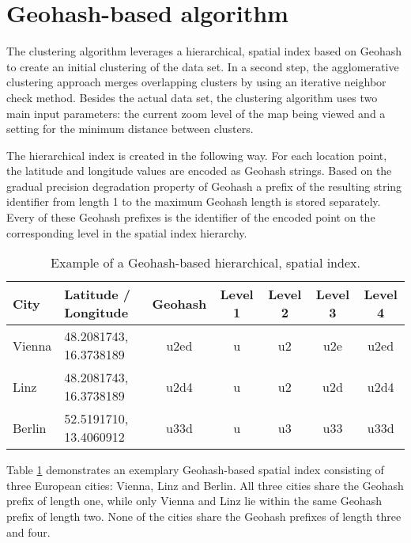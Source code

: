 
%
%

\section{Geohash-based algorithm}
\label{chapter:algorithm}

The clustering algorithm leverages a hierarchical, spatial index based on Geohash to create an initial clustering of the data set. In a second step, the agglomerative clustering approach merges overlapping clusters by using an iterative neighbor check method. Besides the actual data set, the clustering algorithm uses two main input parameters: the current zoom level of the map being viewed and a setting for the minimum distance between clusters. 

The hierarchical index is created in the following way. For each location point, the latitude and longitude values are encoded as Geohash strings. Based on the gradual precision degradation property of Geohash a prefix of the resulting string identifier from length 1 to the maximum Geohash length is stored separately. Every of these Geohash prefixes is the identifier of the encoded point on the corresponding level in the spatial index hierarchy. 


\begin{table}[ht]
\begin{center}
\begin{tabular}{ |l|l|c|c|c|c|c| }
  \hline
  City & Latitude / Longitude & Geohash & Level 1 & Level 2 & Level 3 & Level 4  \\
  \hline
  Vienna & 48.2081743, 16.3738189 & u2ed & u & u2 & u2e & u2ed \\
  Linz   & 48.2081743, 16.3738189 & u2d4 & u & u2 & u2d & u2d4 \\
  Berlin & 52.5191710, 13.4060912 & u33d & u & u3 & u33 & u33d \\
  \hline
\end{tabular}
\caption{Example of a Geohash-based hierarchical, spatial index.}
\label{table:algorithm-geohash}
\end{center}
\end{table}

Table \ref{table:algorithm-geohash} demonstrates an exemplary Geohash-based spatial index consisting of three European cities: Vienna, Linz and Berlin. All three cities share the Geohash prefix of length one, while only Vienna and Linz lie within the same Geohash prefix of length two. None of the cities share the Geohash prefixes of length three and four. 

